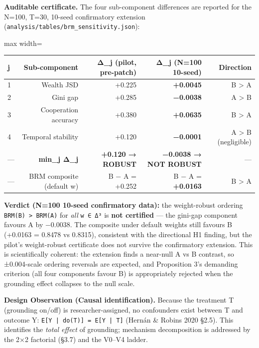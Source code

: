 \textbf{Auditable certificate.} The four sub-component differences are reported for the N=100, T=30, 10-seed confirmatory extension (\texttt{analysis/tables/brm\_sensitivity.json}):

\begin{table}[H]
\centering
\footnotesize
\begin{adjustbox}{max width=\textwidth}
\begin{tabular}{lrrrr}
\toprule
j & Sub-component & Δ\_j (pilot, pre-patch) & Δ\_j (N=100 10-seed) & Direction \\
\midrule
1 & Wealth JSD & +0.225 & \textbf{+0.0045} & B > A \\
2 & Gini gap & +0.285 & \textbf{−0.0038} & A > B \\
3 & Cooperation accuracy & +0.380 & \textbf{+0.0635} & B > A \\
4 & Temporal stability & +0.120 & \textbf{−0.0001} & A > B (negligible) \\
— & \textbf{min\_j Δ\_j} & \textbf{+0.120 → ROBUST} & \textbf{−0.0038 → NOT ROBUST} & — \\
— & BRM composite (default w) & B − A = +0.252 & B − A = \textbf{+0.0163} & B > A \\
\bottomrule
\end{tabular}
\end{adjustbox}
\end{table}

\textbf{Verdict (N=100 10-seed confirmatory data):} the weight-robust ordering \texttt{BRM(B) > BRM(A)} for \textit{all} \texttt{w ∈ Δ³} is \textbf{not certified} — the gini-gap component favours A by −0.0038. The composite under default weights still favours B (+0.0163 = 0.8478 vs 0.8315), consistent with the directional H1 finding, but the pilot's weight-robust certificate does not survive the confirmatory extension. This is scientifically coherent: the extension finds a near-null A vs B contrast, so ±0.004-scale ordering reversals are expected, and Proposition 3's demanding criterion (all four components favour B) is appropriately rejected when the grounding effect collapses to the null scale.

\textbf{Design Observation (Causal identification).} Because the treatment T (grounding on/off) is researcher-assigned, no confounders exist between T and outcome Y: \texttt{E[Y | do(T)] = E[Y | T]} (Hernán \& Robins 2020 §2.5). This identifies the \textit{total effect} of grounding; mechanism decomposition is addressed by the 2×2 factorial (§3.7) and the V0–V4 ladder.

